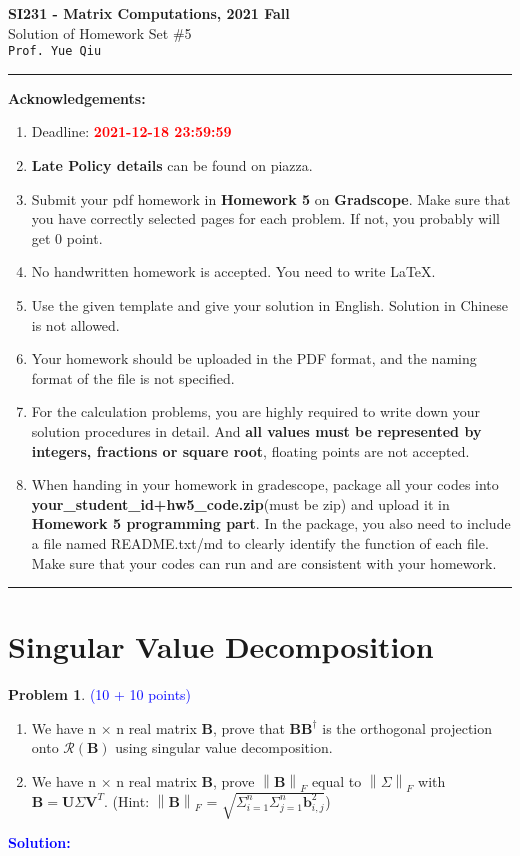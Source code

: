 \documentclass[english,onecolumn]{IEEEtran}
\begin{document}
\begin{center}
	\textbf{\LARGE{SI231 - Matrix Computations, 2021 Fall}}\\
	{\Large Solution of Homework Set \#5}\\
	\texttt{Prof. Yue Qiu}
\par\end{center}

\noindent
\rule{\linewidth}{0.4pt}
{\bf Acknowledgements:}
\begin{enumerate}
	\item Deadline: {\bf \textcolor{red}{2021-12-18 23:59:59}}
	\item \textbf{Late Policy details} can be found on piazza.
	\item Submit your pdf homework in \textbf{Homework 5} on \textbf{Gradscope}. Make sure that you have correctly selected pages for each problem. If not, you probably will get 0 point.
	\item No handwritten homework is accepted. You need to write \LaTeX. 
	\item Use the given template and give your solution in English. Solution in Chinese is not allowed.
	\item Your homework should be uploaded in the PDF format, and the naming format of the file is not specified.
	\item For the calculation problems, you are highly required to write down your solution procedures in detail. And \textbf{all values must be represented by integers, fractions or square root}, floating points are not accepted.
	\item When handing in your homework in gradescope, package all your codes into \textbf{your\_student\_id+hw5\_code.zip}(must be zip) and upload it in \textbf{Homework 5 programming part}. In the package,  you  also  need  to  include  a  file  named  README.txt/md  to  clearly  identify  the function of each file. Make sure that your codes can run and are consistent with your homework.
\end{enumerate}
\rule{\linewidth}{0.4pt}

\section{Singular Value Decomposition}

\noindent\textbf{Problem 1}. \textcolor{blue}{(10 + 10 points)}
\begin{enumerate}
    \item We have n $\times$ n real matrix $\mathbf{B}$, prove that $\mathbf{B}\mathbf{B}^{\dag}$ is the orthogonal projection onto $\mathcal{R}(\mathbf{B})$ using singular value decomposition.
    \item We have n $\times$ n real matrix $\mathbf{B}$, prove $\left \| \mathbf{B} \right \|_{F}$ equal to $ \left \| \Sigma \right \| _{F} $ with $\mathbf{B}=\mathbf{U}\Sigma\mathbf{V}^T$.
    (Hint: $\left \| \mathbf{B} \right \|_{F}$ = $\sqrt{\Sigma_{i=1}^{n} \Sigma_{j=1}^{n} \mathbf{b}_{i,j}^{2}}$)
\end{enumerate}
\noindent\textcolor{blue}{
	\textbf{Solution:}
}
\end{document}
